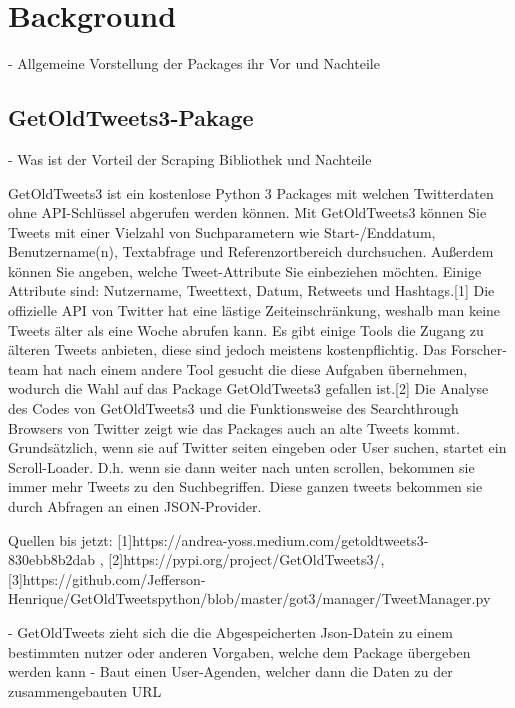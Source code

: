 \section{Background}

	- Allgemeine Vorstellung der Packages ihr Vor und Nachteile
	
	\subsection{GetOldTweets3-Pakage}
	- Was ist der Vorteil der Scraping Bibliothek und Nachteile
	
	GetOldTweets3 ist ein kostenlose Python 3 Packages mit welchen Twitterdaten ohne API-Schlüssel abgerufen werden können.
	Mit GetOldTweets3 können Sie Tweets mit einer Vielzahl von Suchparametern wie Start-/Enddatum, Benutzername(n), Textabfrage 
	und Referenzortbereich durchsuchen. Außerdem können Sie angeben, welche Tweet-Attribute Sie einbeziehen möchten. Einige Attribute
	sind: Nutzername, Tweettext, Datum, Retweets und Hashtags.[1]
	Die offizielle API von Twitter hat eine lästige Zeiteinschränkung, weshalb man keine Tweets älter als eine Woche abrufen 
	kann. Es gibt einige Tools die Zugang zu älteren Tweets anbieten, diese sind jedoch meistens kostenpflichtig. Das Forscher-
	team hat nach einem andere Tool gesucht die diese Aufgaben übernehmen, wodurch die Wahl auf das Package GetOldTweets3 gefallen 
	ist.[2]   	
	Die Analyse des Codes von GetOldTweets3 und die Funktionsweise des Searchthrough Browsers von Twitter zeigt wie das Packages auch
	an alte Tweets kommt. Grundsätzlich, wenn sie auf Twitter seiten eingeben oder User suchen, startet ein Scroll-Loader. D.h. wenn sie
	dann weiter nach unten scrollen, bekommen sie immer mehr Tweets zu den Suchbegriffen. Diese ganzen tweets bekommen sie durch Abfragen 
	an einen JSON-Provider.  
	
	
	Quellen bis jetzt:
	[1]https://andrea-yoss.medium.com/getoldtweets3-830ebb8b2dab ,
	[2]https://pypi.org/project/GetOldTweets3/,
	[3]https://github.com/Jefferson-Henrique/GetOldTweetspython/blob/master/got3/manager/TweetManager.py	

	- GetOldTweets zieht sich die die Abgespeicherten Json-Datein zu einem bestimmten nutzer oder anderen Vorgaben, welche dem Package übergeben werden kann
	- Baut einen User-Agenden, welcher dann die Daten zu der zusammengebauten URL
	

